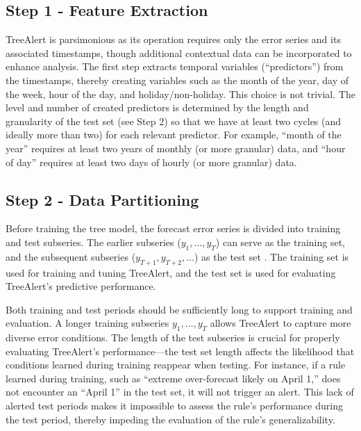 \documentclass[preprint,12pt]{elsarticle}
\begin{document}
\subsection{Step 1 - Feature Extraction}

TreeAlert is parsimonious as its operation requires only the error series and its associated timestamps, though additional contextual data can be incorporated to enhance analysis. The first step extracts temporal variables (“predictors”) from the timestamps, thereby creating variables such as the month of the year, day of the week, hour of the day, and holiday/non-holiday. This choice is not trivial. The level and number of created predictors is determined by the length and granularity of the test set (see Step 2) so that we have at least two cycles (and ideally more than two) for each relevant predictor. For example, “month of the year” requires at least two years of monthly (or more granular) data, and “hour of day” requires at least two days of hourly (or more granular) data.

\subsection{Step 2 - Data Partitioning}

Before training the tree model, the forecast error series is divided into training and test subseries. The earlier subseries ($y_1, \ldots, y_T$) can serve as the training set, and the subsequent subseries ($y_{T+1}, y_{T+2}, \ldots$) as the test set \citep{shmueli2024}. The training set is used for training and tuning TreeAlert, and the test set is used for evaluating TreeAlert's predictive performance.

Both training and test periods should be sufficiently long to support training and evaluation. %
A longer training subseries $y_1, \ldots, y_T$ allows TreeAlert to capture more diverse error conditions. %
The length of the test subseries is crucial for properly evaluating TreeAlert's performance---the test set length affects %
the likelihood that conditions learned during training reappear when testing. For instance, if a rule learned during training, such as ``extreme over-forecast likely on April 1,'' does not encounter an ``April 1'' in the test set, it will not trigger an alert. This lack of alerted test periods makes it impossible to assess the rule's performance during the test period, thereby impeding the evaluation of the rule’s generalizability.
\end{document}
